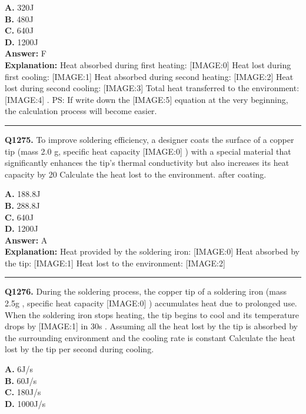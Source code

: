 \documentclass[12pt]{article}
\begin{document}
\textbf{A.} 320J \\
\textbf{B.} 480J \\
\textbf{C.} 640J \\
\textbf{D.} 1200J \\

\textbf{Answer:} F \\
\textbf{Explanation:} Heat absorbed during first heating:
[IMAGE:0]
Heat lost during first cooling:
[IMAGE:1]
Heat absorbed during second heating:
[IMAGE:2]
Heat lost during second cooling:
[IMAGE:3]
Total heat transferred to the environment:
[IMAGE:4]
.
PS: If write down the
[IMAGE:5]
equation at the very beginning, the calculation process will become easier.

\hrule
\vspace{1em}


\noindent
\textbf{Q1275.} To improve soldering efficiency, a designer coats the surface of a copper tip (mass 2.0 g, specific heat capacity
[IMAGE:0]
) with a special material that significantly enhances the tip's thermal conductivity but also increases its heat capacity by 20%
Calculate the heat lost to the environment. after coating.



\textbf{A.} 188.8J \\
\textbf{B.} 288.8J \\
\textbf{C.} 640J \\
\textbf{D.} 1200J \\

\textbf{Answer:} A \\
\textbf{Explanation:} Heat provided by the soldering iron:
[IMAGE:0]
Heat absorbed by the tip:
[IMAGE:1]
Heat lost to the environment:
[IMAGE:2]

\hrule
\vspace{1em}


\noindent
\textbf{Q1276.} During the soldering process, the copper tip of a soldering iron (mass 2.5g
, specific heat capacity
[IMAGE:0]
) accumulates heat due to prolonged use. When the soldering iron stops heating, the tip begins to cool and its temperature drops by
[IMAGE:1]
in 30s
. Assuming all the heat lost by the tip is absorbed by the surrounding environment and the cooling rate is constant
Calculate the heat lost by the tip per second during cooling.



\textbf{A.} 6J/s \\
\textbf{B.} 60J/s \\
\textbf{C.} 180J/s \\
\textbf{D.} 1000J/s \\
\end{document}
